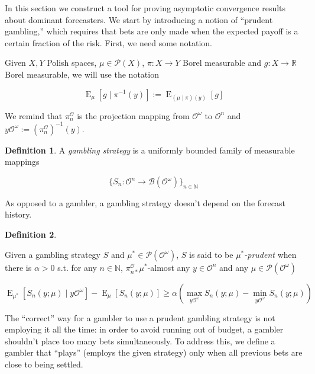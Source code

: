 \documentclass[aop,preprint]{imsart}
\numberwithin{equation}{section}
\theoremstyle{definition}
\newtheorem{definition}{Definition}[section]
\theoremstyle{plain}
\newcommand{\Nats}{\mathbb{N}}
\newcommand{\Reals}{\mathbb{R}}
\newcommand{\Sq}[2]{\{#1\}_{#2 \in \Nats}}
\newcommand{\Sqn}[1]{\Sq{#1}{n}}
\DeclareMathOperator{\E}{E}
\newcommand{\PM}{\mathcal{P}}
\newcommand{\Ob}{\mathcal{O}}
\newcommand{\OO}{\Ob^\omega}
\newcommand{\PO}{\pi^\Ob}
\newcommand{\PMO}{\PM(\OO)}
\newcommand{\Gm}{\mathcal{B}}
\newcommand{\GMO}{\Gm(\OO)}
\begin{document}
In this section we construct a tool for proving asymptotic convergence results about dominant forecasters. We start by introducing a notion of \enquote{prudent gambling,} which requires that bets are only made when the expected payoff is a certain fraction of the risk. First, we need some notation.

Given $X,Y$ Polish spaces, $\mu \in \PM(X)$, $\pi: X \rightarrow Y$ Borel measurable and $g: X \rightarrow \Reals$ Borel measurable, we will use the notation 

\begin{equation}
\E_{\mu}\left[g \mid \pi^{-1}\left(y\right)\right]:=\E_{\left(\mu \mid \pi\right)\left(y\right)}\left[g\right]
\end{equation}

We remind that $\PO_n$ is the projection mapping from $\OO$ to $\Ob^n$ and $y\OO:= \left(\PO_{n}\right)^{-1}\left(y\right)$.

\begin{definition}

A \emph{gambling strategy} is a uniformly bounded family of measurable mappings

\[\Sqn{S_n: \Ob^n \rightarrow \GMO}\]

\end{definition}

As opposed to a gambler, a gambling strategy doesn't depend on the forecast history.

\begin{definition}
\label{def:prudent}

Given a gambling strategy $S$ and $\mu^* \in \PMO$, $S$ is said to be \emph{$\mu^*$-prudent} when there is $\alpha > 0$ s.t. for any $n \in \Nats$, $\PO_{n*} \mu^*$-almost any $y \in \Ob^n$ and any $\mu \in \PMO$

\begin{equation}
\E_{\mu^*}\left[S_n\left(y; \mu\right) \mid y\OO\right] - \E_\mu\left[S_n\left(y; \mu\right)\right] \geq \alpha \left(\max_{y\OO}{S_n\left(y; \mu\right)} - \min_{y\OO}{S_n\left(y; \mu\right)}\right)
\end{equation}

\end{definition}

The \enquote{correct} way for a gambler to use a prudent gambling strategy is not employing it all the time: in order to avoid running out of budget, a gambler shouldn’t place too many bets simultaneously. To address this, we define a gambler that \enquote{plays} (employs the given strategy) only when all previous bets are close to being settled.
\end{document}
